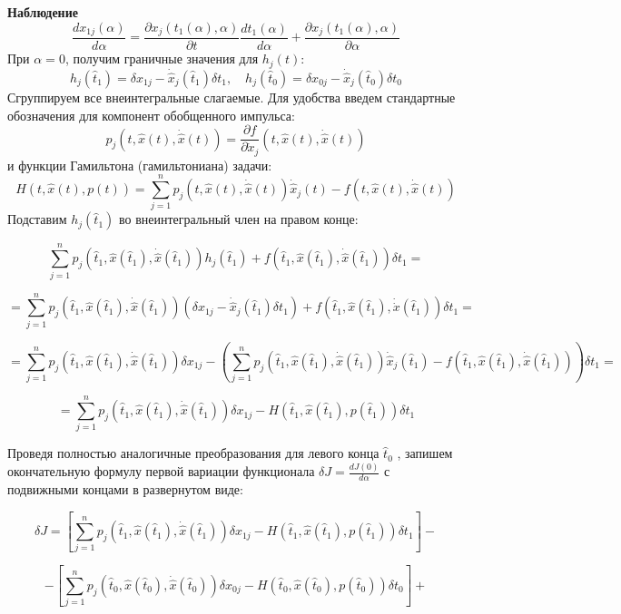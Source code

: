 \textbf{Наблюдение}\\
$$\frac{d x_{1j}(\alpha)}{d \alpha} = \frac{\partial x_j(t_1(\alpha), \alpha)}{\partial t} \frac{d t_1(\alpha)}{d \alpha} + \frac{\partial x_j(t_1(\alpha), \alpha)}{\partial \alpha}$$
При $\alpha = 0$, 
получим граничные значения для $h_j(t)$:
$$h_j(\hat{t}_1) = \delta x_{1j} - \dot{\hat{x}}_j(\hat{t}_1) \delta t_1, \quad h_j(\hat{t}_0) = \delta x_{0j} - \dot{\hat{x}}_j(\hat{t}_0) \delta t_0$$
Сгруппируем все внеинтегральные слагаемые. Для удобства введем стандартные обозначения для компонент обобщенного импульса:
$$p_j\left(t, \hat{x}(t), \dot{\hat{x}}(t)\right) = \frac{\partial f}{\partial \dot{x}_j}\left(t, \hat{x}(t), \dot{\hat{x}}(t)\right)$$
и функции Гамильтона (гамильтониана) задачи:
$$H\left(t, \hat{x}(t), p(t)\right) = \sum_{j=1}^n p_j\left(t, \hat{x}(t), \dot{\hat{x}}(t)\right) \dot{\hat{x}}_j(t) - f\left(t, \hat{x}(t), \dot{\hat{x}}(t)\right)$$
Подставим $h_j(\hat{t}_1)$ во внеинтегральный член на правом конце:


$$\sum_{j=1}^n p_j(\hat{t}_1, \hat{x}(\hat{t}_1), \dot{\hat{x}}(\hat{t}_1)) h_j(\hat{t}_1) + f(\hat{t}_1, \hat{x}(\hat{t}_1), \dot{\hat{x}}(\hat{t}_1)) \delta t_1 =$$

$$= \sum_{j=1}^n p_j(\hat{t}_1, \hat{x}(\hat{t}_1), \dot{\hat{x}}(\hat{t}_1)) \left( \delta x_{1j} - \dot{\hat{x}}_j(\hat{t}_1) \delta t_1 \right) + f(\hat{t}_1, \hat{x}(\hat{t}_1), \dot{\dot{x}}(\hat{t}_1)) \delta t_1 =$$

$$= \sum_{j=1}^n p_j(\hat{t}_1, \hat{x}(\hat{t}_1), \dot{\hat{x}}(\hat{t}_1)) \delta x_{1j} - \left( \sum_{j=1}^n p_j(\hat{t}_1, \hat{x}(\hat{t}_1), \dot{\hat{x}}(\hat{t}_1)) \dot{\hat{x}}_j(\hat{t}_1) - f(\hat{t}_1, \hat{x}(\hat{t}_1), \dot{\hat{x}}(\hat{t}_1)) \right) \delta t_1 =$$

$$= \sum_{j=1}^n p_j(\hat{t}_1, \hat{x}(\hat{t}_1), \dot{\hat{x}}(\hat{t}_1)) \delta x_{1j} - H\left(\hat{t}_1, \hat{x}(\hat{t}_1), p(\hat{t}_1)\right) \delta t_1$$

Проведя полностью аналогичные преобразования для левого конца $\hat{t}_0$ , запишем окончательную формулу первой вариации функционала $\delta J = \frac{dJ(0)}{d\alpha}$ с подвижными концами в развернутом виде:


$$\delta J = \left[ \sum_{j=1}^n p_j(\hat{t}_1, \hat{x}(\hat{t}_1), \dot{\hat{x}}(\hat{t}_1)) \delta x_{1j} - H\left(\hat{t}_1, \hat{x}(\hat{t}_1), p(\hat{t}_1)\right) \delta t_1 \right] -$$

$$- \left[ \sum_{j=1}^n p_j(\hat{t}_0, \hat{x}(\hat{t}_0), \dot{\hat{x}}(\hat{t}_0)) \delta x_{0j} - H\left(\hat{t}_0, \hat{x}(\hat{t}_0), p(\hat{t}_0)\right) \delta t_0 \right] +$$


